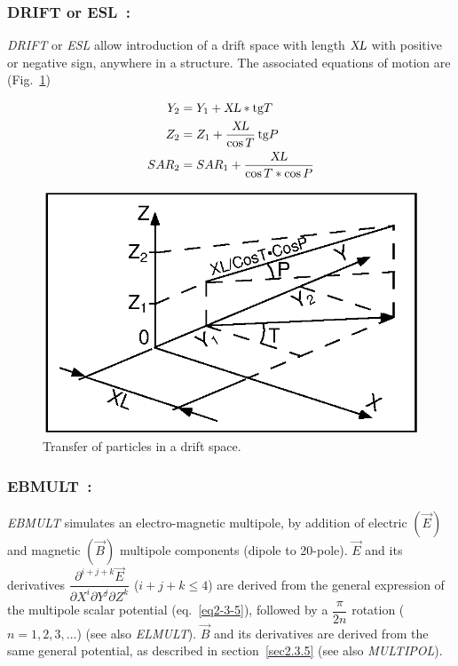 {\newpage
\subsubsection*{DRIFT or ESL~: \DRIFTTitl}\label{ESL}\label{DRIFT}
\medskip

\textsl{DRIFT} or \textsl{ESL} allow introduction of a drift space with length $ \textsl{XL} $ with 
positive or negative sign, anywhere in a structure.  The associated equations 
of motion are (Fig.~\ref{fig23})   

\begin{align*}
	Y_2 &   =    Y_1+\textsl{XL} \ast \text{tg} T  \\ 
	Z_2 &   =   Z_1 + \dfrac{\textsl{XL}}{\cos  T}\,  \text{tg} P  \\
	SAR_2 &   =  SAR_1+ \dfrac{\textsl{XL} }{\cos  T  \ast \cos  P}  
\end{align*}
\vfill

\begin{figure}[H]
\centerline{\includegraphics[width=15cm]{Fig23.ps}}
\caption{\label{fig23}Transfer of particles in a drift space.}
\end{figure}
\vfill

\newpage
\subsubsection*{EBMULT~: \EBMULTTitl}\label{EBMULT} 
\medskip

\noindent\textsl{EBMULT} simulates an electro-magnetic multipole, by addition of
electric $ (\vec  E) $ and magnetic $ (\vec  B) $ multipole components (dipole to 20-pole). 
$\vec  E $ and its derivatives 
$ \dfrac{\partial^{ i+j+k} \vec  E }{ \partial X^i\partial Y^j\partial Z^k} $ 
($i+j+k \le 4$) are derived 
from the general expression of the multipole scalar potential (eq.~\ref{eq2-3-5}), followed by a 
$ \dfrac{\pi }{2n} $ rotation  ($n= 1, 2, 3, ...$)  (see also \textsl{ELMULT}). $ \vec  B $ and its
derivatives are derived from the same general potential, as described in section~\ref{sec2.3.5} 
(see also \textsl{MULTIPOL}). 

}
